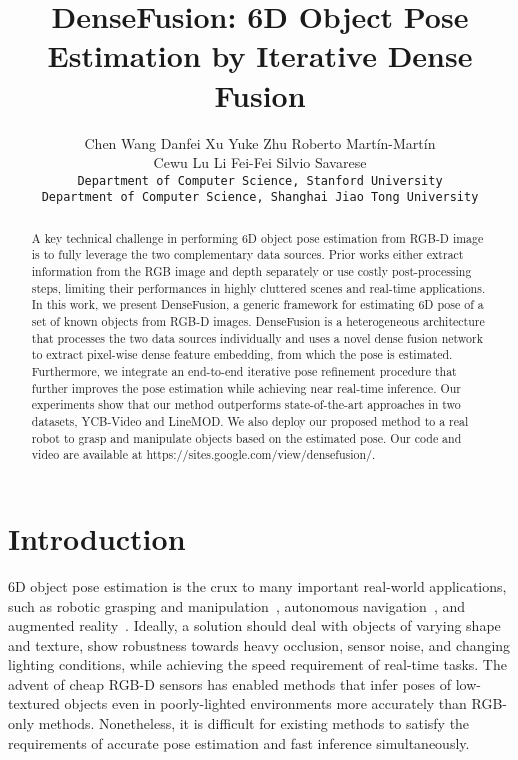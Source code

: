 \documentclass[10pt,twocolumn,letterpaper]{article}
\begin{document}
\title{DenseFusion: 6D Object Pose Estimation by Iterative Dense Fusion}

\author{Chen Wang \qquad Danfei Xu \qquad Yuke Zhu \qquad Roberto Mart\'{i}n-Mart\'{i}n\\Cewu Lu \qquad Li Fei-Fei \qquad Silvio Savarese\\
{\tt\small Department of Computer Science, Stanford University}\\
{\tt\small Department of Computer Science, Shanghai Jiao Tong University}
}

\maketitle

\begin{abstract}
A key technical challenge in performing 6D object pose estimation from RGB-D image is to fully leverage the two complementary data sources. Prior works either extract information from the RGB image and depth separately or use costly post-processing steps, limiting their performances in highly cluttered scenes and real-time applications. In this work, we present DenseFusion, a generic framework for estimating 6D pose of a set of known objects from RGB-D images. DenseFusion is a heterogeneous architecture that processes the two data sources individually and uses a novel dense fusion network to extract pixel-wise dense feature embedding, from which the pose is estimated. Furthermore, we integrate an end-to-end iterative pose refinement procedure that further improves the pose estimation while achieving near real-time inference. Our experiments show that our method outperforms state-of-the-art approaches in two datasets, YCB-Video and LineMOD. We also deploy our proposed method to a real robot to grasp and manipulate objects based on the estimated pose. Our code and video are available at https://sites.google.com/view/densefusion/.
\end{abstract}

\section{Introduction}

6D object pose estimation is the crux to many important real-world applications, such as robotic grasping and manipulation~\cite{collet2011moped,zhu2014single,tremblay2018deep}, autonomous navigation~\cite{kitti,xu2017pointfusion,mv3d}, and augmented reality~\cite{tangle,marchand2016pose}. Ideally, a solution should deal with objects of varying shape and texture, show robustness towards heavy occlusion, sensor noise, and changing lighting conditions, while achieving the speed requirement of real-time tasks. The advent of cheap RGB-D sensors has enabled methods that infer poses of low-textured objects even in poorly-lighted environments more accurately than RGB-only methods. Nonetheless, it is difficult for existing methods to satisfy the requirements of accurate pose estimation and fast inference simultaneously.
\end{document}
